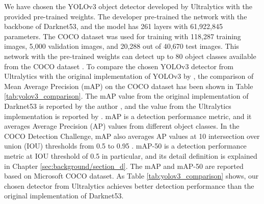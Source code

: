 We have chosen the YOLOv3 object detector developed by Ultralytics \cite{jocher_ultralyticsyolov3_2021} with the provided pre-trained weights. The developer \citeauthor{jocher_ultralyticsyolov3_2021} pre-trained the network with the backbone of Darknet53, and the model has 261 layers with 61,922,845 parameters. The COCO dataset was used for training with 118,287 training images, 5,000 validation images, and 20,288 out of 40,670 test images. This network with the pre-trained weights can detect up to 80 object classes available from the COCO dataset \cite{lin_microsoft_2014}. To compare the chosen YOLOv3 detector from Ultralytics with the original implementation of YOLOv3 by \citeauthor{redmon_yolov3_2018}, the comparison of Mean Average Precision (mAP) on the COCO dataset has been shown in Table \ref{tab:yolov3_comparison}. The mAP value from the original implementation of Darknet53 is reported by the author \citeauthor{redmon_yolov3_2018}, and the value from the Ultralytics implementation is reported by \citeauthor{jocher_ultralyticsyolov3_2021} \cite{jocher_ultralyticsyolov3_2021}. mAP is a detection performance metric, and it averages Average Precision (AP) values from different object classes. In the COCO Detection Challenge, mAP also averages AP values at 10 intersection over union (IOU) thresholds from 0.5 to 0.95 \cite{lin_microsoft_2014} \cite{noauthor_coco_nodate}. mAP-50 is a detection performance metric at IOU threshold of 0.5 in particular, and its detail definition is explained in Chapter \ref{sec:background/section_d}. The mAP and mAP-50 are reported based on Microsoft COCO dataset. As Table \ref{tab:yolov3_comparison} shows, our chosen detector from Ultralytics achieves better detection performance than the original implementation of Darknet53.
